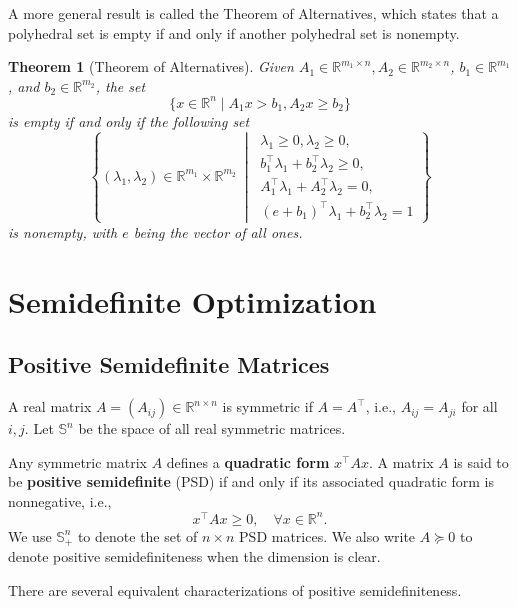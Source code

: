 \documentclass[
]{book}
\newtheorem{theorem}{Theorem}[chapter]
\theoremstyle{definition}
\theoremstyle{definition}
\theoremstyle{definition}
\theoremstyle{definition}
\theoremstyle{remark}
\begin{document}
A more general result is called the Theorem of Alternatives, which states that a polyhedral set is empty if and only if another polyhedral set is nonempty.

\begin{theorem}[Theorem of Alternatives]
\protect\hypertarget{thm:Alternative}{}\label{thm:Alternative}Given \(A_1 \in \mathbb{R}^{m_1 \times n}, A_2 \in \mathbb{R}^{m_2 \times n}\), \(b_1 \in \mathbb{R}^{m_1}\), and \(b_2 \in \mathbb{R}^{m_2}\), the set
\[
\{ x \in \mathbb{R}^{n} \mid A_1 x > b_1, A_2 x \geq b_2 \}
\]
is empty if and only if the following set
\[
 \left\{ (\lambda_1,\lambda_2) \in \mathbb{R}^{m_1} \times \mathbb{R}^{m_2}\ \middle\vert\ \begin{array}{r} \lambda_1 \geq 0, \lambda_2 \geq 0, \\ b_1^\top\lambda_1 + b_2^\top\lambda_2 \geq 0, \\ A_1^\top\lambda_1 + A_2^\top\lambda_2 = 0, \\ (e + b_1)^\top\lambda_1 + b_2^\top\lambda_2 = 1 \end{array}  \right\} 
\]
is nonempty, with \(e\) being the vector of all ones.
\end{theorem}

\chapter{Semidefinite Optimization}\label{sdp}

\section{Positive Semidefinite Matrices}\label{positive-semidefinite-matrices}

A real matrix \(A = (A_{ij}) \in \mathbb{R}^{n \times n}\) is symmetric if \(A = A^\top\), i.e., \(A_{ij} = A_{ji}\) for all \(i,j\). Let \(\mathbb{S}^{n}\) be the space of all real symmetric matrices.

Any symmetric matrix \(A\) defines a \textbf{quadratic form} \(x^\top A x\). A matrix \(A\) is said to be \textbf{positive semidefinite} (PSD) if and only if its associated quadratic form is nonnegative, i.e.,
\[
x^\top A x \geq 0, \quad \forall x \in \mathbb{R}^{n}.
\]
We use \(\mathbb{S}^{n}_{+}\) to denote the set of \(n\times n\) PSD matrices. We also write \(A \succeq 0\) to denote positive semidefiniteness when the dimension is clear.

There are several equivalent characterizations of positive semidefiniteness.
\end{document}
